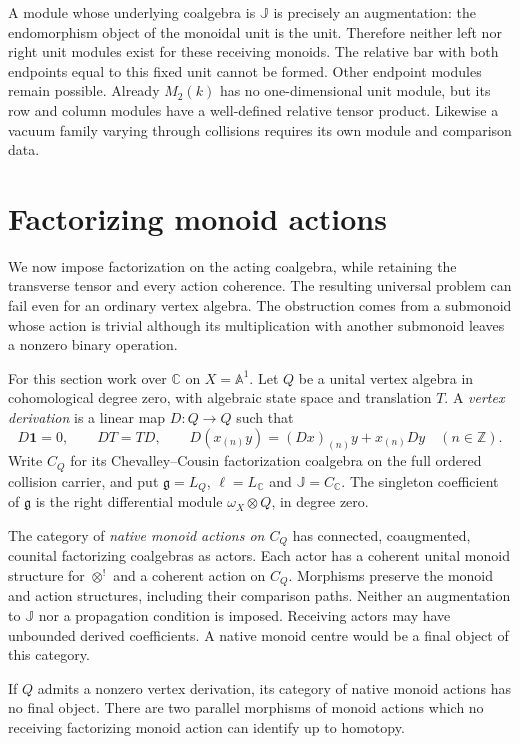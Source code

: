 A module whose underlying coalgebra is $\mathbb J$ is
precisely an augmentation: the endomorphism object of the
monoidal unit is the unit. Therefore neither left nor right
unit modules exist for these receiving monoids. The relative
bar with both endpoints equal to this fixed unit cannot be
formed. Other endpoint modules remain possible. Already
$M_2(k)$ has no one-dimensional unit module, but its row
and column modules have a well-defined relative tensor
product. Likewise a vacuum family varying through collisions
requires its own module and comparison data.

\section{Factorizing monoid actions}
\label{cycen:sec:native}

We now impose factorization on the acting coalgebra, while
retaining the transverse tensor and every action coherence.
The resulting universal problem can fail even for an ordinary
vertex algebra. The obstruction comes from a submonoid whose
action is trivial although its multiplication with another
submonoid leaves a nonzero binary operation.

For this section work over $\mathbb C$ on $X=\mathbb A^1$.
Let $Q$ be a unital vertex algebra in cohomological degree zero,
with algebraic state space and translation $T$. A
\emph{vertex derivation} is a linear map $D:Q\to Q$ such that
\[
 D\mathbf1=0,\qquad DT=TD,\qquad
 D(x_{(n)}y)=(Dx)_{(n)}y+x_{(n)}Dy
 \quad(n\in\mathbb Z).
\]
Write $C_Q$ for its Chevalley--Cousin factorization coalgebra
on the full ordered collision carrier, and put
$\mathfrak g=L_Q$, $\ell=L_{\mathbb C}$ and
$\mathbb J=C_{\mathbb C}$. The singleton coefficient of
$\mathfrak g$ is the right differential module
$\omega_X\otimes Q$, in degree zero.

The category of \emph{native monoid actions on $C_Q$} has
connected, coaugmented, counital factorizing coalgebras as
actors. Each actor has a coherent unital monoid structure for
$\otimes^!$ and a coherent action on $C_Q$. Morphisms preserve
the monoid and action structures, including their comparison
paths. Neither an augmentation to $\mathbb J$ nor a
propagation condition is imposed. Receiving actors may have
unbounded derived coefficients. A native monoid centre would
be a final object of this category.

\begin{theorem}\label{cycen:thm:native-obstruction}
If $Q$ admits a nonzero vertex derivation, its category of
native monoid actions has no final object. There are two
parallel morphisms of monoid actions which no receiving
factorizing monoid action can identify up to homotopy.
\end{theorem}

